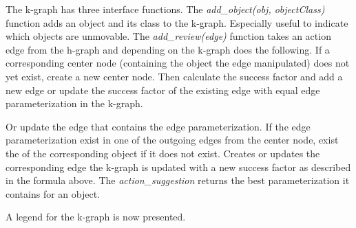 The \ac{k-graph} has three interface functions. The \textit{add\_object(\gls{obj}, \gls{objectClass})} function adds an object and its class to the \ac{k-graph}. Especially useful to indicate which objects are unmovable. The \textit{add\_review(\gls{edge})} function takes an action edge from the \ac{h-graph} and depending on the \ac{k-graph} does the following. If a corresponding center node (containing the object the edge manipulated) does not yet exist, create a new center node. Then calculate the success factor and add a new edge or update the success factor of the existing edge with equal edge parameterization in the \ac{k-graph}.  

Or update the edge that contains the edge parameterization. If the edge parameterization exist in one of the outgoing edges from the center node, exist the of the corresponding object if it does not exist. Creates or updates the corresponding edge  the \ac{k-graph} is updated with a new success factor as described in the formula above. The \textit{action\_suggestion} returns the best parameterization it contains for an object.\bs

A legend for the \ac{k-graph} is now presented.\bs

